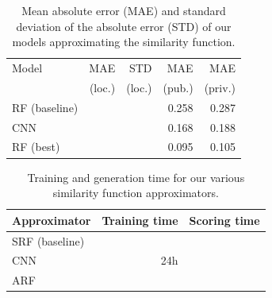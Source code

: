 \documentclass[10pt,conference,compsocconf]{IEEEtran}
\begin{document}
\begin{table}\centering
\begin{tabular}{lrr|rr}
\toprule
Model & MAE & STD &  MAE &  MAE \\
 & (loc.) & (loc.) & (pub.) & (priv.) \\
\midrule
RF (baseline) & & & 0.258 & 0.287 \\
CNN & & & 0.168 & 0.188 \\
RF (best) & & & 0.095 & 0.105 \\
\bottomrule
\end{tabular}
\caption{Mean absolute error (MAE) and standard deviation of the absolute error (STD) of our models approximating the similarity function.}\label{tab:SFA_MSS}
\end{table}




\begin{table}[htbp]
  \centering
  \begin{tabular}[c]{|l||r|r|}
    \hline
    Approximator    & Training time     & Scoring time \\
    \hline
    SRF (baseline)             &                   &       \\
    CNN             & 24h               &       \\
    ARF             &                   &       \\
    \hline
  \end{tabular}
  \caption{Training and generation time for our various similarity function approximators.}
  \label{tab:SFA_time}
\end{table}
\end{document}
